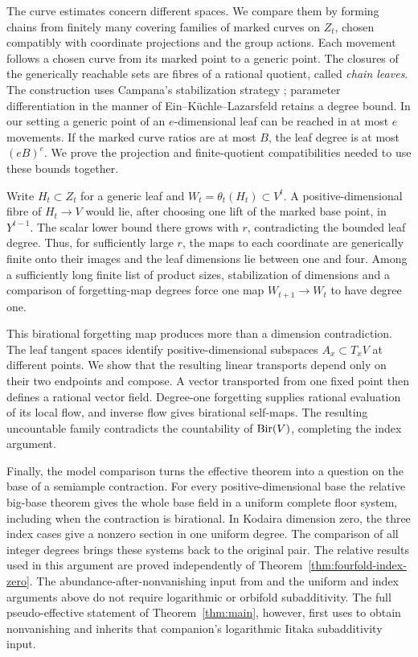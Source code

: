 The curve estimates concern different spaces. We compare them by
forming chains from finitely many covering families of marked
curves on $Z_t$, chosen compatibly with coordinate projections and
the group actions. Each movement follows a chosen curve from its
marked point to a generic point. The closures of the generically reachable sets
are fibres of a rational quotient, called \emph{chain leaves}.
The construction uses Campana's stabilization strategy
\cite[Theorem~1.1 and its proof sketch]{Campana2004};
parameter differentiation in the manner of Ein--K\"uchle--Lazarsfeld
\cite[Proposition~2.3]{EinKuchleLazarsfeld1995} retains a degree
bound. In our setting a generic point of an $e$-dimensional leaf
can be reached in at most $e$ movements. If the marked curve
ratios are at most $B$, the leaf degree is at most $(eB)^e$.
We prove the projection and finite-quotient compatibilities needed
to use these bounds together.

Write $H_t\subset Z_t$ for a generic leaf and
$W_t=\theta_t(H_t)\subset V^t$. A positive-dimensional fibre of
$H_t\to V$ would lie, after choosing one lift of the marked base
point, in $Y^{t-1}$. The scalar lower bound there grows with $r$,
contradicting the bounded leaf degree. Thus, for sufficiently large
$r$, the maps to each coordinate are generically finite onto their
images and the leaf dimensions lie between one and four. Among a
sufficiently long finite list of product sizes, stabilization of
dimensions and a comparison of forgetting-map degrees force one
map $W_{t+1}\to W_t$ to have degree one.

This birational forgetting map produces more than a dimension
contradiction. The leaf tangent spaces identify positive-dimensional
subspaces $A_x\subset T_xV$ at different points. We show that the
resulting linear transports depend only on their two endpoints
and compose. A vector transported from one fixed point then defines
a rational vector field. Degree-one forgetting supplies rational
evaluation of its local flow, and inverse flow gives birational
self-maps. The resulting uncountable family contradicts the
countability of $\operatorname{Bir}(V)$, completing the index argument.

Finally, the model comparison turns the effective theorem into a
question on the base of a semiample contraction. For every
positive-dimensional base the relative big-base theorem
\cite[Proposition~\REffectiveNumber]{OpenAIRelative} gives the
whole base field in a uniform complete floor system, including when
the contraction is birational. In
Kodaira dimension zero, the three index cases give a nonzero section
in one uniform degree. The comparison of all
integer degrees brings these systems back to the original pair.
The relative results used in this argument are proved independently
of Theorem~\ref{thm:fourfold-index-zero}. The abundance-after-nonvanishing
input from \cite{OpenAILifting} and the uniform and index arguments above
do not require logarithmic or orbifold subadditivity. The full
pseudo-effective statement of Theorem~\ref{thm:main}, however, first uses
\cite{OpenAIAbundance} to obtain nonvanishing and inherits that companion's
logarithmic Iitaka subadditivity input.

